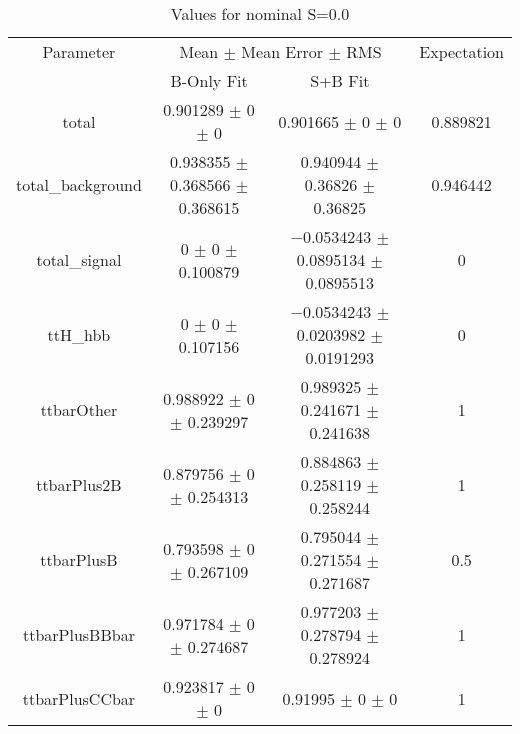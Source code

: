 \begin{table}
\centering
\caption{Values for nominal S=0.0}
\begin{tabular}{cccc}
\toprule
Parameter & \multicolumn{2}{c}{Mean $\pm$ Mean Error $\pm$ RMS} & Expectation\\
 & B-Only Fit & S+B Fit & \\
\midrule
total & \num{0.901289} $\pm$ \num{0} $\pm$ \num{0} & \num{0.901665} $\pm$ \num{0} $\pm$ \num{0} & \num{0.889821}\\
total\_background & \num{0.938355} $\pm$ \num{0.368566} $\pm$ \num{0.368615} & \num{0.940944} $\pm$ \num{0.36826} $\pm$ \num{0.36825} & \num{0.946442}\\
total\_signal & \num{0} $\pm$ \num{0} $\pm$ \num{0.100879} & \num{-0.0534243} $\pm$ \num{0.0895134} $\pm$ \num{0.0895513} & \num{0}\\
ttH\_hbb & \num{0} $\pm$ \num{0} $\pm$ \num{0.107156} & \num{-0.0534243} $\pm$ \num{0.0203982} $\pm$ \num{0.0191293} & \num{0}\\
ttbarOther & \num{0.988922} $\pm$ \num{0} $\pm$ \num{0.239297} & \num{0.989325} $\pm$ \num{0.241671} $\pm$ \num{0.241638} & \num{1}\\
ttbarPlus2B & \num{0.879756} $\pm$ \num{0} $\pm$ \num{0.254313} & \num{0.884863} $\pm$ \num{0.258119} $\pm$ \num{0.258244} & \num{1}\\
ttbarPlusB & \num{0.793598} $\pm$ \num{0} $\pm$ \num{0.267109} & \num{0.795044} $\pm$ \num{0.271554} $\pm$ \num{0.271687} & \num{0.5}\\
ttbarPlusBBbar & \num{0.971784} $\pm$ \num{0} $\pm$ \num{0.274687} & \num{0.977203} $\pm$ \num{0.278794} $\pm$ \num{0.278924} & \num{1}\\
ttbarPlusCCbar & \num{0.923817} $\pm$ \num{0} $\pm$ \num{0} & \num{0.91995} $\pm$ \num{0} $\pm$ \num{0} & \num{1}\\
\bottomrule
\end{tabular}
\end{table}